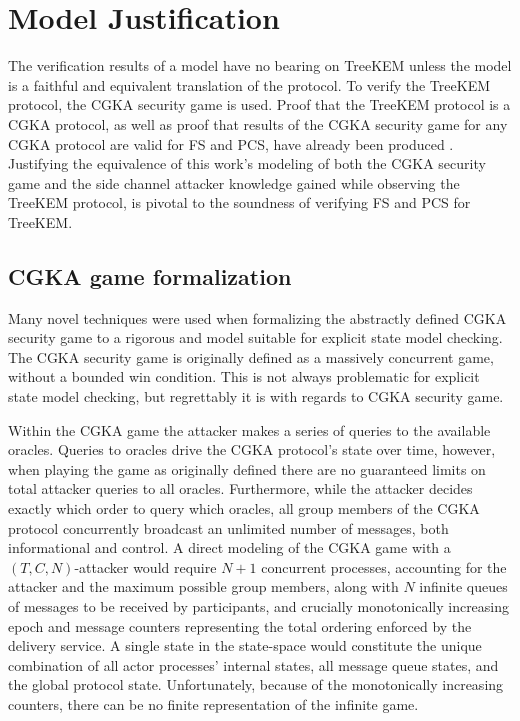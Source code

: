 \hypertarget{sec:justification}{%
\chapter{Model Justification}\label{sec:justification}}

The verification results of a model have no bearing on TreeKEM unless the model is a faithful and equivalent translation of the protocol.
To verify the TreeKEM protocol, the CGKA security game is used.
Proof that the TreeKEM protocol is a CGKA protocol, as well as proof that results of the CGKA security game for any CGKA protocol are valid for FS and PCS, have already been produced \autocite{alwen2020security}.
Justifying the equivalence of this work's modeling of both the CGKA security game and the side channel attacker knowledge gained while observing the TreeKEM protocol, is pivotal to the soundness of verifying FS and PCS for TreeKEM.


\hypertarget{sec:game-adaptations}{%
\section{CGKA game formalization}\label{sec:game-adaptations}}

Many novel techniques were used when formalizing the abstractly defined CGKA security game to a rigorous and model suitable for explicit state model checking.
The CGKA security game is originally defined as a massively concurrent game, without a bounded win condition.
This is not always problematic for explicit state model checking, but regrettably it is with regards to CGKA security game.

Within the CGKA game the attacker makes a series of queries to the available oracles.
Queries to oracles drive the CGKA protocol's state over time, however, when playing the game as originally defined there are no guaranteed limits on total attacker queries to all oracles.
Furthermore, while the attacker decides exactly which order to query which oracles, all group members of the CGKA protocol concurrently broadcast an unlimited number of messages, both informational and control.
A direct modeling of the CGKA game with a \((T, C, N)\)-attacker would require \(N+1\) concurrent processes, accounting for the attacker and the maximum possible group members, along with \(N\) infinite queues of messages to be received by participants, and crucially monotonically increasing epoch and message counters representing the total ordering enforced by the delivery service.
A single state in the state-space would constitute the unique combination of all actor processes' internal states, all message queue states, and the global protocol state.
Unfortunately, because of the monotonically increasing counters, there can be no finite representation of the infinite game.

